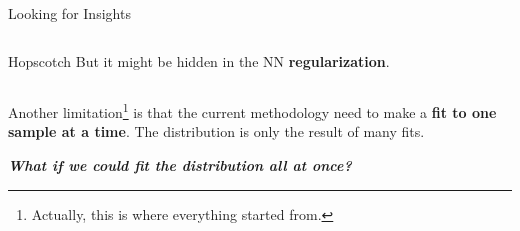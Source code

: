 \documentclass[9pt]{beamer}
\begin{document}
\begin{frame}{Looking for Insights}
\begin{columns}
\begin{column}{0.5\textwidth}
\begin{exampleblock}{Hopscotch}
                But it might be hidden in the NN \textbf{regularization}.
            \end{exampleblock}

        \end{column}
    \end{columns}

    \vspace*{10pt}
    Another limitation\footnote{
        Actually, this is where everything started from.
    } is that the current methodology need to make a \textbf{fit to \alert{one
    sample} at a time}. The distribution is only the result of many fits.

    \vspace*{-5pt}
    \begin{center}
        \itshape
        \bfseries
        What if we could fit the distribution all at once?
    \end{center}
    \vspace*{-10pt}
\end{frame}
\end{document}
